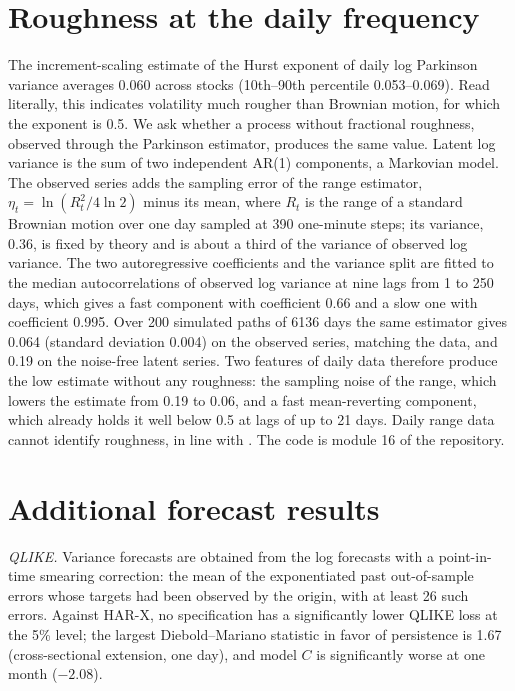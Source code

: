 \section[\appendixname~\thesection]{Roughness at the daily frequency}\label{app:rough}

The increment-scaling estimate of the Hurst exponent of daily log Parkinson
variance averages 0.060 across stocks (10th--90th percentile 0.053--0.069).
Read literally, this indicates volatility much rougher than Brownian motion,
for which the exponent is 0.5. We ask whether a
process without fractional roughness, observed through the Parkinson
estimator, produces the same value. Latent log variance is the sum of two
independent AR(1) components, a Markovian model. The observed series adds the
sampling error of the range estimator, $\eta_t = \ln(R_t^2/4\ln 2)$ minus its
mean, where $R_t$ is the range of a standard Brownian motion over one day
sampled at 390 one-minute steps; its variance, 0.36, is fixed by theory and
is about a third of the variance of observed log variance. The two
autoregressive coefficients and the variance split are fitted to the median
autocorrelations of observed log variance at nine lags from 1 to 250 days,
which gives a fast component with coefficient 0.66 and a slow one with
coefficient 0.995. Over 200 simulated paths of 6136 days the same estimator
gives 0.064 (standard deviation 0.004) on the observed series, matching the
data, and 0.19 on the noise-free latent series. Two features of daily data
therefore produce the low estimate without any roughness: the sampling noise
of the range, which lowers the estimate from 0.19 to 0.06, and a fast
mean-reverting component, which already holds it well below 0.5 at lags of up
to 21 days. Daily range data cannot identify roughness, in line with
\citet{cont2024rough}. The code is module 16 of the repository.

\section[\appendixname~\thesection]{Additional forecast results}\label{app:extra}

\textit{QLIKE.} Variance forecasts are obtained from the log forecasts with a
point-in-time smearing correction: the mean of the exponentiated past
out-of-sample errors whose targets had been observed by the origin, with at
least 26 such errors. Against HAR-X, no specification has a significantly
lower QLIKE loss at the 5\% level; the largest Diebold--Mariano statistic in
favor of persistence is 1.67 (cross-sectional extension, one day), and model
$C$ is significantly worse at one month ($-2.08$).


